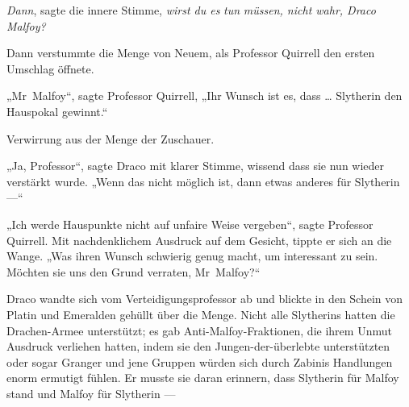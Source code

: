 \emph{Dann}, sagte die innere Stimme, \emph{wirst du es} \emph{tun} \emph{müssen, nicht wahr, Draco Malfoy?}

Dann verstummte die Menge von Neuem, als Professor Quirrell den ersten Umschlag öffnete.

„Mr~Malfoy“, sagte Professor Quirrell,
„Ihr Wunsch ist es, dass … Slytherin den Hauspokal gewinnt.“

Verwirrung aus der Menge der Zuschauer.

„Ja, Professor“, sagte Draco mit klarer Stimme, wissend dass sie nun wieder verstärkt wurde.
„Wenn das nicht möglich ist, dann etwas anderes für Slytherin —“

„Ich werde Hauspunkte nicht auf unfaire Weise vergeben“, sagte Professor Quirrell. Mit nachdenklichem Ausdruck auf dem Gesicht, tippte er sich an die Wange.
„Was ihren Wunsch schwierig genug macht, um interessant zu sein. Möchten sie uns den Grund verraten, Mr~Malfoy?“

Draco wandte sich vom Verteidigungsprofessor ab und blickte in den Schein von Platin und Emeralden gehüllt über die Menge. Nicht alle Slytherins hatten die Drachen-Armee unterstützt; es gab Anti-Malfoy-Fraktionen, die ihrem Unmut Ausdruck verliehen hatten, indem sie den Jungen-der-überlebte unterstützten oder sogar Granger und jene Gruppen würden sich durch Zabinis Handlungen enorm ermutigt fühlen. Er musste sie daran erinnern, dass Slytherin für Malfoy stand und Malfoy für Slytherin —

